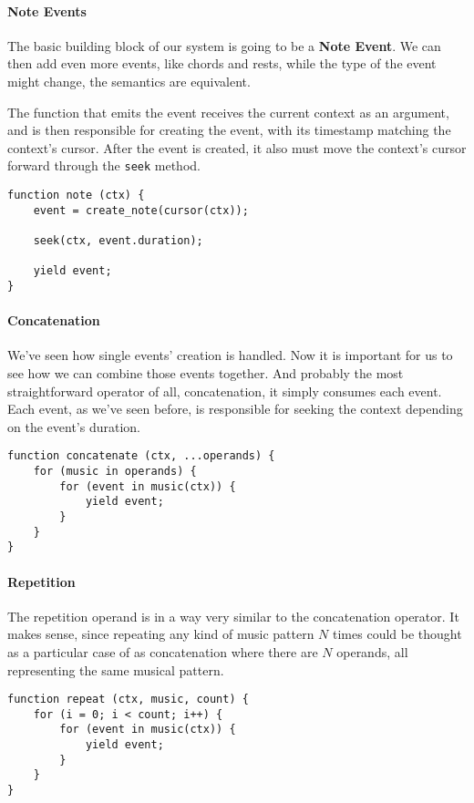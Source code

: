 \documentclass[a4paper,UKenglish,cleveref, autoref]{oasics-v2019}
\begin{document}
\paragraph*{Note Events}
The basic building block of our system is going to be a \textbf{Note Event}. We can then add even more events, like chords and rests, while the type of the event might change, the semantics are equivalent.

The function that emits the event receives the current context as an argument, and is then responsible for creating the event, with its timestamp matching the context's cursor. After the event is created, it also must move the context's cursor forward through the \texttt{seek} method.
\begin{lstlisting}[caption={Creating a Note Event},label=list:8-6,captionpos=t,abovecaptionskip=-\medskipamount]
function note (ctx) {
    event = create_note(cursor(ctx));
    
    seek(ctx, event.duration);
    
    yield event;
}
\end{lstlisting}

\paragraph*{Concatenation}
We've seen how single events' creation is handled. Now it is important for us to see how we can combine those events together. And probably the most straightforward operator of all, concatenation, it simply consumes each event. Each event, as we've seen before, is responsible for seeking the context depending on the event's duration.
\begin{lstlisting}[caption={Algorithm to concatenate musical events},label=list:8-6,captionpos=t,abovecaptionskip=-\medskipamount]
function concatenate (ctx, ...operands) {
    for (music in operands) {
        for (event in music(ctx)) {
            yield event;
        }
    }
}
\end{lstlisting}
\paragraph*{Repetition}
The repetition operand is in a way very similar to the concatenation operator. It makes sense, since repeating any kind of music pattern $N$ times could be thought as a particular case of as concatenation where there are $N$ operands, all representing the same musical pattern.

\begin{lstlisting}[caption={Algorithm for repetition},label=list:8-6,captionpos=t,abovecaptionskip=-\medskipamount]
function repeat (ctx, music, count) {
    for (i = 0; i < count; i++) {
        for (event in music(ctx)) {
            yield event;
        }
    }
}
\end{lstlisting}
\end{document}
